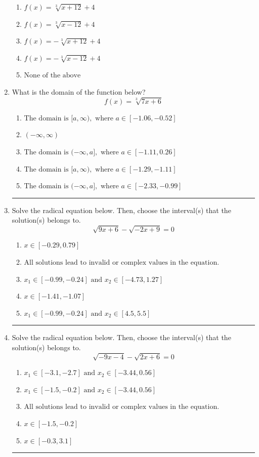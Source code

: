 \documentclass[14pt]{extbook}
\newcommand{\litem}[1]{\item#1\hspace*{-1cm}\rule{\textwidth}{0.4pt}}
\begin{document}
\begin{enumerate}
{\begin{center}
\end{center}
\begin{enumerate}[label=\Alph*.]
\item \( f(x) = \sqrt[3]{x + 12} + 4 \)
\item \( f(x) = \sqrt[3]{x - 12} + 4 \)
\item \( f(x) = - \sqrt[3]{x + 12} + 4 \)
\item \( f(x) = - \sqrt[3]{x - 12} + 4 \)
\item \( \text{None of the above} \)

\end{enumerate} }
\litem{
What is the domain of the function below?\[ f(x) = \sqrt[3]{7 x + 6} \]\begin{enumerate}[label=\Alph*.]
\item \( \text{The domain is } [a, \infty), \text{   where } a \in [-1.06, -0.52] \)
\item \( (-\infty, \infty) \)
\item \( \text{The domain is } (-\infty, a], \text{   where } a \in [-1.11, 0.26] \)
\item \( \text{The domain is } [a, \infty), \text{   where } a \in [-1.29, -1.11] \)
\item \( \text{The domain is } (-\infty, a], \text{   where } a \in [-2.33, -0.99] \)

\end{enumerate} }
\litem{
Solve the radical equation below. Then, choose the interval(s) that the solution(s) belongs to.\[ \sqrt{9 x + 6} - \sqrt{-2 x + 9} = 0 \]\begin{enumerate}[label=\Alph*.]
\item \( x \in [-0.29,0.79] \)
\item \( \text{All solutions lead to invalid or complex values in the equation.} \)
\item \( x_1 \in [-0.99, -0.24] \text{ and } x_2 \in [-4.73,1.27] \)
\item \( x \in [-1.41,-1.07] \)
\item \( x_1 \in [-0.99, -0.24] \text{ and } x_2 \in [4.5,5.5] \)

\end{enumerate} }
\litem{
Solve the radical equation below. Then, choose the interval(s) that the solution(s) belongs to.\[ \sqrt{-9 x - 4} - \sqrt{2 x + 6} = 0 \]\begin{enumerate}[label=\Alph*.]
\item \( x_1 \in [-3.1, -2.7] \text{ and } x_2 \in [-3.44,0.56] \)
\item \( x_1 \in [-1.5, -0.2] \text{ and } x_2 \in [-3.44,0.56] \)
\item \( \text{All solutions lead to invalid or complex values in the equation.} \)
\item \( x \in [-1.5,-0.2] \)
\item \( x \in [-0.3,3.1] \)


\end{enumerate}}
\end{enumerate}
\end{document}
